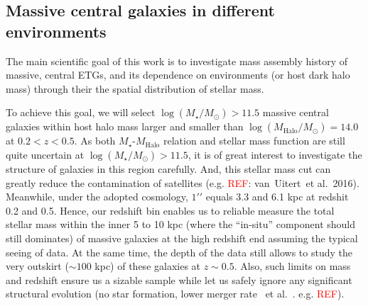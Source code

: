 \documentclass[preprint]{aastex}
\def\arcsec{{\prime\prime}}
\def\etal{{\ et al.~}}
\def\logms{$\log (M_{\star}/M_{\odot})$}
\def\logmh{$\log (M_{\mathrm{Halo}}/M_{\odot})$}
\newcommand{\addref}{{\textcolor{red}{REF}}}
\begin{document}
\begin{CJK*}{UTF8}{gbsn}
\subsection{Massive central galaxies in different environments}

    The main scientific goal of this work is to investigate mass assembly history 
    of massive, central ETGs, and its dependence on environments (or host dark halo 
    mass) through their the spatial distribution of stellar mass.  
    
    To achieve this goal, we will select \logms$ > 11.5$ massive central 
    galaxies within host halo mass larger and smaller than \logmh$= 14.0$
    at $0.2 < z < 0.5$.  
    As both $M_{\star}$-$M_{\mathrm{Halo}}$ relation and stellar mass function 
    are still quite uncertain at \logms$ > 11.5$, it is of great interest to 
    investigate the structure of galaxies in this region carefully.
    And, this stellar mass cut can greatly reduce the contamination of 
    satellites (e.g. \addref: van~Uitert\etal 2016).  
    Meanwhile, under the adopted cosmology, $1\arcsec$ equals 3.3 and 6.1 kpc 
    at redshit 0.2 and 0.5.  
    Hence, our redshift bin enables us to reliable measure the total stellar 
    mass within the inner 5 to 10 kpc (where the ``in-situ'' component should 
    still dominates) of massive galaxies at the high redshift end assuming the
    typical seeing of data. 
    At the same time, the depth of the data still allows to study the very 
    outskirt ($\sim 100$ kpc) of these galaxies at $z\sim 0.5$.  
    Also, such limits on mass and redshift ensure us a sizable sample while let 
    us safely ignore any significant structural evolution (no star formation, 
    lower merger rate \etal. e.g. \addref). 
        

\end{CJK*}
\end{document}
